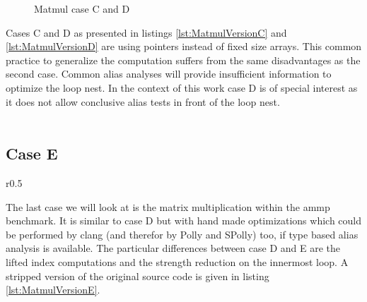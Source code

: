 \begin{figure}[htpb]
  \centering
  \hfill
  \caption{Matmul case C and D}
   \label{lst:MatmulVersionCD}
\end{figure}

Cases C and D as presented in listings \ref{lst:MatmulVersionC} and 
\ref{lst:MatmulVersionD} are using pointers instead of fixed size arrays. 
This common practice to generalize the computation suffers from the same 
disadvantages as the second case. Common alias analyses will provide insufficient
information to optimize the loop nest. In the context of this work case D is 
of special interest as it does not allow conclusive alias tests in front of the
loop nest. \\ ~\\

\subsection*{Case E}
\begin{wrapfigure}[]{r}{0.5\textwidth}
    \hfill
    \hfill
  \begin{minipage}[c]{0.4\textwidth}
    \vspace*{-7mm}
    
    \end{minipage}
    \hfill
    \hfill
    \caption{Matmul case E, extracted from the ammp benchmark (SPEC 2000)}
    \vspace*{-4mm}
    \label{lst:MatmulVersionE}
\end{wrapfigure}
The last case we will look at is the matrix multiplication within the ammp 
benchmark. It is similar to case D but with hand made optimizations which could
be performed by clang (and therefor by Polly and SPolly) too, if type based alias
analysis is available. The particular differences between case D and
E are the lifted index computations and the strength reduction on the innermost
loop.  A stripped version of the original source code is given in 
listing \ref{lst:MatmulVersionE}.  \\

